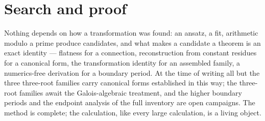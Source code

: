 \documentclass[11pt]{article}
\begin{document}
\section{Search and proof}
Nothing depends on how a transformation was found: an ansatz, a
fit, arithmetic modulo a prime produce candidates, and what makes a
candidate a theorem is an exact identity --- flatness for a
connection, reconstruction from constant residues for a canonical
form, the transformation identity for an assembled family, a
numerics-free derivation for a boundary period.  At the time of
writing all but the three three-root families carry canonical forms
established in this way; the three-root families await the
Galois-algebraic treatment, and the higher boundary periods and the
endpoint analysis of the full inventory are open campaigns.  The
method is complete; the calculation, like every large calculation,
is a living object.
\end{document}
